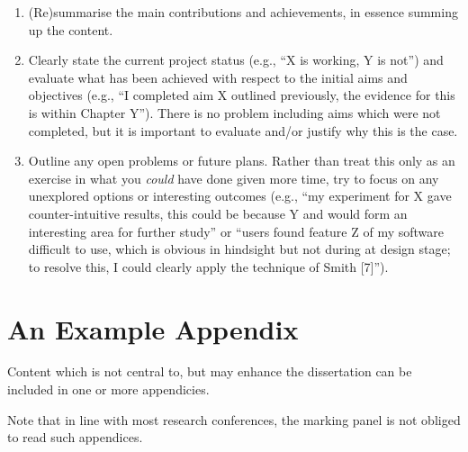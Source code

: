 \documentclass[ %
                    author={Lucas O'Dowd-Jones},
                supervisor={Dr. Alex Kavvos},
                    degree={MEng},
                     title={Variations on Normalisation by Evaluation in Haskell},
                  subtitle={},
                      type={programming languages},
                      year={2021}]{dissertation}
\begin{document}
\begin{enumerate}
\item (Re)summarise the main contributions and achievements, in essence
      summing up the content.
\item Clearly state the current project status (e.g., ``X is working, Y 
      is not'') and evaluate what has been achieved with respect to the 
      initial aims and objectives (e.g., ``I completed aim X outlined 
      previously, the evidence for this is within Chapter Y'').  There 
      is no problem including aims which were not completed, but it is 
      important to evaluate and/or justify why this is the case.
\item Outline any open problems or future plans.  Rather than treat this
      only as an exercise in what you {\em could} have done given more 
      time, try to focus on any unexplored options or interesting outcomes
      (e.g., ``my experiment for X gave counter-intuitive results, this 
      could be because Y and would form an interesting area for further 
      study'' or ``users found feature Z of my software difficult to use,
      which is obvious in hindsight but not during at design stage; to 
      resolve this, I could clearly apply the technique of Smith [7]'').
\end{enumerate}


%
%

\backmatter

\printbibliography



\appendix

\chapter{An Example Appendix}
\label{appx:example}

Content which is not central to, but may enhance the dissertation can be 
included in one or more appendicies.

\noindent
Note that in line with most research conferences, the marking panel is not
obliged to read such appendices.

\end{document}
